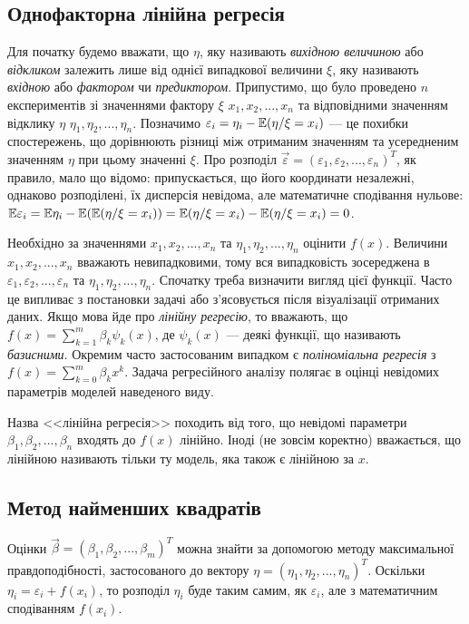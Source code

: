 \subsection{Однофакторна лінійна регресія}
Для початку будемо вважати, що $\eta$, яку називають \emph{вихідною величиною} або \emph{відкликом} залежить лише від однієї випадкової величини $\xi$,
яку називають \emph{вхідною} або \emph{фактором} чи \emph{предиктором}. Припустимо, 
що було проведено $n$ експериментів зі значеннями фактору $\xi$ $x_1, x_2, ..., x_n$ та відповідними
значенням відклику $\eta$ $\eta_1, \eta_2, ..., \eta_n$. Позначимо
$\varepsilon_i = \eta_i - \mathbb{E}(\eta / \xi = x_i)$ --- це похибки спостережень, що дорівнюють різниці
між отриманим значенням та усередненим значенням $\eta$ при цьому значенні $\xi$.
Про розподіл $\vec{\varepsilon} = (\varepsilon_1, \varepsilon_2, ..., \varepsilon_n)^T$, як правило, мало що відомо:
припускається, що його координати незалежні, однаково розподілені, їх дисперсія невідома, але математичне сподівання нульове:
$\mathbb{E}\varepsilon_i = \mathbb{E}\eta_i - \mathbb{E}(\mathbb{E}(\eta / \xi = x_i)) = \mathbb{E}(\eta / \xi = x_i) - \mathbb{E}(\eta / \xi = x_i) = 0$.

Необхідно за значеннями $x_1, x_2, ..., x_n$ та $\eta_1, \eta_2, ..., \eta_n$ оцінити $f(x)$.
Величини $x_1, x_2, ..., x_n$ вважають невипадковими, тому вся випадковість зосереджена в
$\varepsilon_1, \varepsilon_2, ..., \varepsilon_n$ та $\eta_1, \eta_2, ..., \eta_n$.
Спочатку треба визначити вигляд цієї функції. Часто це випливає з постановки задачі або з'ясовується після візуалізації отриманих даних.
Якщо мова йде про \emph{лінійну регресію}, то вважають, що
$f(x) = \sum\limits_{k=1}^m \beta_k \psi_k(x)$, де $\psi_k(x)$ --- деякі функції, що називають \emph{базисними}.
Окремим часто застосованим випадком є \emph{поліноміальна регресія} з 
$f(x) = \sum\limits_{k=0}^m \beta_k x^k$. Задача регресійного аналізу полягає в оцінці невідомих параметрів моделей наведеного виду.
\begin{remark}
    Назва <<лінійна регресія>> походить від того, що невідомі параметри $\beta_1, \beta_2, ..., \beta_n$ входять до $f(x)$ лінійно.
    Іноді (не зовсім коректно) вважається, що лінійною називають тільки ту модель, яка також
    є лінійною за $x$.
\end{remark}

\subsection{Метод найменших квадратів}
Оцінки $\vec{\beta} = (\beta_1, \beta_2, ..., \beta_m)^T$ можна знайти за допомогою методу максимальної правдоподібності,
застосованого до вектору $\eta = \left(\eta_1, \eta_2, ..., \eta_n\right)^T$.
Оскільки $\eta_i = \varepsilon_i + f(x_i)$, то розподіл $\eta_i$ буде таким самим, як 
$\varepsilon_i$, але з математичним сподіванням $f(x_i)$.

